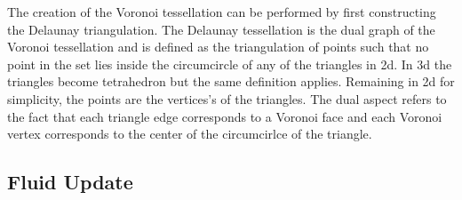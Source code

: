 The creation of the Voronoi tessellation can be performed by first constructing
the Delaunay triangulation. The Delaunay tessellation is the dual graph of the
Voronoi tessellation and is defined as the triangulation of points such that
no point in the set lies inside the circumcircle of any of the triangles in
2d. In 3d the triangles become tetrahedron but the same definition applies.
Remaining in 2d for simplicity, the points are the vertices's of the triangles.
The dual aspect refers to the fact that each triangle edge corresponds to a
Voronoi face and each Voronoi vertex corresponds to the center of the
circumcirlce of the triangle. 

\subsection{Fluid Update}
